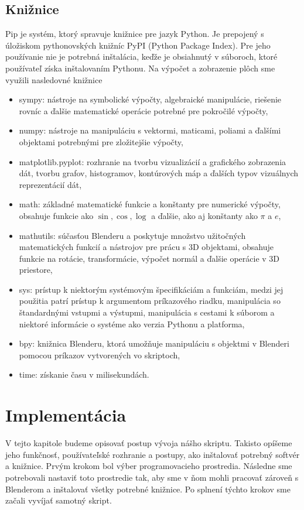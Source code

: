 \subsection{Knižnice}
Pip je systém, ktorý spravuje knižnice pre jazyk Python. Je prepojený s úložiskom
pythonovských knižníc PyPI (Python Package Index). Pre jeho používanie nie je
potrebná inštalácia, keďže je obsiahnutý v súboroch, ktoré používateľ získa inštalovaním Pythonu. Na výpočet a zobrazenie plôch sme využili nasledovné knižnice
\begin{itemize}
\item sympy: nástroje na symbolické výpočty, algebraické manipulácie, riešenie rovníc a ďalšie matematické operácie potrebné pre pokročilé výpočty,
\item numpy: nástroje na manipuláciu s vektormi, maticami, poliami a ďalšími objektami potrebnými pre zložitejšie výpočty,
\item matplotlib.pyplot: rozhranie na tvorbu vizualizácií a grafického zobrazenia dát, tvorbu grafov, histogramov, kontúrových máp a ďalších typov vizuálnych reprezentácií dát,
\item math: základné matematické funkcie a konštanty pre numerické výpočty, obsahuje funkcie ako $\sin, \cos, \log$ a ďalšie, ako aj konštanty ako $\pi$ a $e$,
\item mathutils: súčasťou Blenderu a poskytuje množstvo užitočných matematických funkcií a nástrojov pre prácu s 3D objektami, obsahuje funkcie na rotácie, transformácie, výpočet normál a ďalšie operácie v 3D priestore,
\item sys: prístup k niektorým systémovým špecifikáciám a funkciám, medzi jej použitia patrí prístup k argumentom príkazového riadku, manipulácia so štandardnými vstupmi a výstupmi, manipulácia s cestami k súborom a niektoré informácie o systéme ako verzia Pythonu a platforma,
\item bpy: knižnica Blenderu, ktorá umožňuje manipuláciu s objektmi v Blenderi pomocou príkazov vytvorených vo skriptoch,
\item time: získanie času v milisekundách. 
\end{itemize}

\section{Implementácia}
V tejto kapitole budeme opisovať postup vývoja nášho skriptu. Takisto opíšeme jeho
funkčnosť, používateľské rozhranie a postupy, ako inštalovať potrebný softvér a knižnice.
Prvým krokom bol výber programovacieho prostredia. Následne sme potrebovali
nastaviť toto prostredie tak, aby sme v ňom mohli pracovať zároveň s Blenderom a
inštalovať všetky potrebné knižnice. Po splnení týchto krokov sme začali vyvíjať samotný skript.
